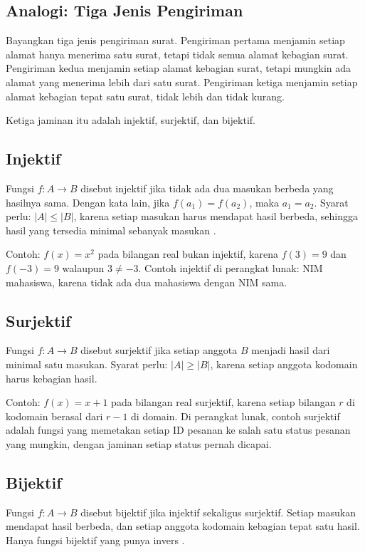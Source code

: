 \documentclass[11pt,a4paper]{article}
\begin{document}
\subsection{Analogi: Tiga Jenis Pengiriman}

Bayangkan tiga jenis pengiriman surat. Pengiriman pertama menjamin setiap alamat hanya menerima satu surat, tetapi tidak semua alamat kebagian surat. Pengiriman kedua menjamin setiap alamat kebagian surat, tetapi mungkin ada alamat yang menerima lebih dari satu surat. Pengiriman ketiga menjamin setiap alamat kebagian tepat satu surat, tidak lebih dan tidak kurang.

Ketiga jaminan itu adalah injektif, surjektif, dan bijektif.

\subsection{Injektif}

Fungsi $f:A \to B$ disebut injektif jika tidak ada dua masukan berbeda yang hasilnya sama. Dengan kata lain, jika $f(a_1)=f(a_2)$, maka $a_1=a_2$. Syarat perlu: $|A| \le |B|$, karena setiap masukan harus mendapat hasil berbeda, sehingga hasil yang tersedia minimal sebanyak masukan \cite{rosen}.

Contoh: $f(x)=x^2$ pada bilangan real bukan injektif, karena $f(3)=9$ dan $f(-3)=9$ walaupun $3 \ne -3$. Contoh injektif di perangkat lunak: NIM mahasiswa, karena tidak ada dua mahasiswa dengan NIM sama.

\subsection{Surjektif}

Fungsi $f:A \to B$ disebut surjektif jika setiap anggota $B$ menjadi hasil dari minimal satu masukan. Syarat perlu: $|A| \ge |B|$, karena setiap anggota kodomain harus kebagian hasil.

Contoh: $f(x)=x+1$ pada bilangan real surjektif, karena setiap bilangan $r$ di kodomain berasal dari $r-1$ di domain. Di perangkat lunak, contoh surjektif adalah fungsi yang memetakan setiap ID pesanan ke salah satu status pesanan yang mungkin, dengan jaminan setiap status pernah dicapai.

\subsection{Bijektif}

Fungsi $f:A \to B$ disebut bijektif jika injektif sekaligus surjektif. Setiap masukan mendapat hasil berbeda, dan setiap anggota kodomain kebagian tepat satu hasil. Hanya fungsi bijektif yang punya invers \cite{rosen}.
\end{document}
